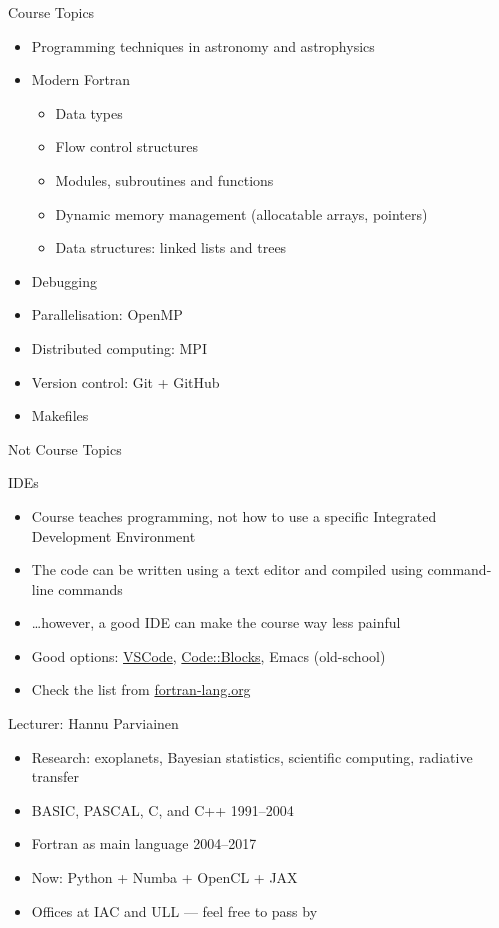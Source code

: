 \begin{frame}{Course Topics}
  \begin{itemize}
  	\item Programming techniques in astronomy and astrophysics
    \item Modern Fortran
      \begin{itemize}
        \item Data types
        \item Flow control structures
        \item Modules, subroutines and functions
        \item Dynamic memory management (allocatable arrays, pointers)
        \item Data structures: linked lists and trees
      \end{itemize}
    \item Debugging
    \item Parallelisation: OpenMP
    \item Distributed computing: MPI
    \item Version control: Git + GitHub
    \item Makefiles
  \end{itemize}
\end{frame}


\begin{frame}{Not Course Topics}
	\begin{block}{IDEs}
	\begin{itemize}
		\item Course teaches programming, not how to use a specific Integrated Development Environment
		\item The code can be written using a text editor and compiled using command-line commands
		\item \ldots however, a good IDE can make the course way less painful
		\item Good options: \href{https://code.visualstudio.com}{VSCode}, \href{https://www.codeblocks.org/}{Code::Blocks}, Emacs (old-school)
		\item Check the list from \href{https://fortran-lang.org/learn/os_setup/ides/}{fortran-lang.org}
	\end{itemize}
	\end{block}
\end{frame}


\begin{frame}{Lecturer: Hannu Parviainen}
  \begin{itemize}
    \item Research: exoplanets, Bayesian statistics, scientific computing, radiative transfer
    \item BASIC, PASCAL, C, and C++ 1991--2004
    \item Fortran as main language 2004--2017
    \item Now: Python + Numba + OpenCL + JAX
    \item Offices at IAC and ULL — feel free to pass by
  \end{itemize}
\end{frame}

